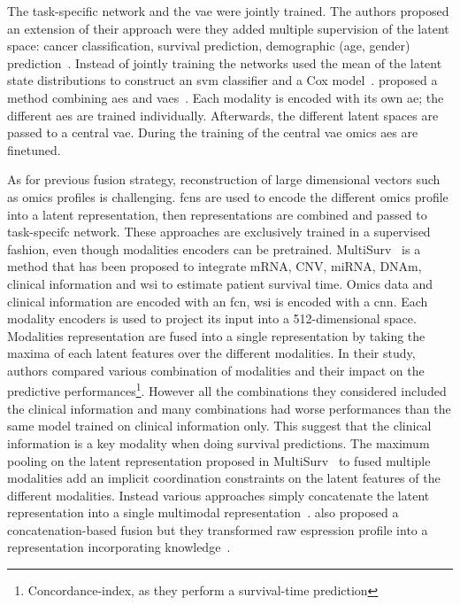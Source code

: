 \documentclass[../main.tex]{subfiles}
\begin{document}
		The task-specific network and the \gls{vae} were jointly trained.
		The authors proposed an extension of their approach were they added multiple supervision of the latent space: cancer classification, survival prediction, demographic (age, gender) prediction~\cite{Zhang2021}.
		Instead of jointly training the networks \citeauthor{Hira2021} used the mean of the latent state distributions to construct an \gls{svm} classifier and a Cox model~\cite{Hira2021}.
		\citeauthor{customics} proposed a method combining \glspl{ae} and \glspl{vae}~\cite{customics}.
		Each modality is encoded with its own \gls{ae}; the different \glspl{ae} are trained individually.
		Afterwards, the different latent spaces are passed to a central \gls{vae}.
		During the training of the central \gls{vae} omics \glspl{ae} are finetuned.

		As for previous fusion strategy, reconstruction of large dimensional vectors such as omics profiles is challenging.
		\Glspl{fcn} are used to encode the different omics profile into a latent representation, then representations are combined and passed to task-specifc network.
		These approaches are exclusively trained in a supervised fashion, even though modalities encoders can be pretrained.
		MultiSurv~\cite{MultiSurv} is a method that has been proposed to integrate mRNA, CNV, miRNA, DNAm, clinical information and \gls{wsi} to estimate patient survival time.
		Omics data and clinical information are encoded with an \gls{fcn}, \gls{wsi} is encoded with a \gls{cnn}.
		Each modality encoders is used to project its input into a 512-dimensional space.
		Modalities representation are fused into a single representation by taking the maxima of each latent features over the different modalities.
		In their study, authors compared various combination of modalities and their impact on the predictive performances\footnote{Concordance-index, as they perform a survival-time prediction}.
		However all the combinations they considered included the clinical information and many combinations had worse performances than the same model trained on clinical information only.
		This suggest that the clinical information is a key modality when doing survival predictions.
		The maximum pooling on the latent representation proposed in MultiSurv~\cite{MultiSurv} to fused multiple modalities add an implicit coordination constraints on the latent features of the different modalities.
		Instead various approaches simply concatenate the latent representation into a single multimodal representation~\cite{MOLI,Lin2020}.
		\citeauthor{SALMON} also proposed a concatenation-based fusion but they transformed raw espression profile into a representation incorporating knowledge~\cite{SALMON}.
\end{document}
